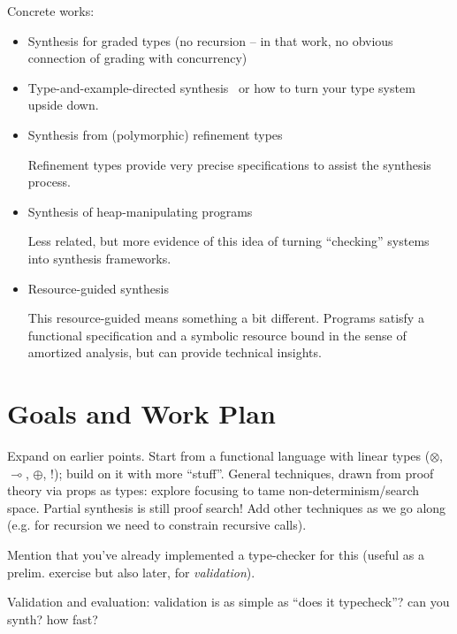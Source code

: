 \documentclass{llncs}
\newcommand{\lolli}{\multimap}
\newcommand{\tensor}{\otimes}
\newcommand{\bang}{{!}}
\begin{document}
Concrete works:
\begin{itemize}
\item Synthesis for graded types (no recursion   -- in that work, no
  obvious connection of grading with
  concurrency)~\cite{DBLP:conf/lopstr/HughesO20}

\item Type-and-example-directed
  synthesis~\cite{DBLP:conf/pldi/OseraZ15,DBLP:conf/popl/FrankleOWZ16}
  or how to turn your type system upside down.
  
\item Synthesis from (polymorphic) refinement types~\cite{DBLP:conf/pldi/PolikarpovaKS16}

Refinement types provide very precise specifications to assist the
synthesis process.

\item Synthesis of heap-manipulating
  programs~\cite{DBLP:journals/pacmpl/PolikarpovaS19}

Less related, but more evidence of this idea of turning ``checking''
systems into synthesis frameworks.

\item Resource-guided synthesis \cite{DBLP:conf/pldi/KnothWP019}

This resource-guided means something a bit different. Programs satisfy
a functional specification and a symbolic resource bound in the sense
of amortized analysis, but can provide technical insights.

\end{itemize}

\section{Goals and Work Plan}

Expand on earlier points. Start from a functional language with linear
types ($\tensor$, $\lolli$, $\oplus$, $\bang$); build on it with more
``stuff''. General techniques, drawn from proof theory via props as
types: explore focusing to tame non-determinism/search space. Partial
synthesis is still proof search! Add other techniques as we go along
(e.g. for recursion we need to constrain recursive calls).

Mention that you've already implemented a type-checker for this
(useful as a prelim. exercise but also later, for \emph{validation}).

Validation and evaluation: validation is as simple as ``does it typecheck''? can you synth? how fast?
\end{document}

